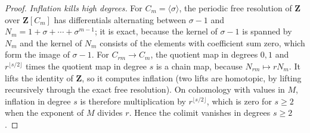 \documentclass[11pt,a4paper]{article}
\numberwithin{equation}{section}
\theoremstyle{definition}
\theoremstyle{remark}
\begin{document}
\begin{proof}
\emph{Inflation kills high degrees.} For $C_m=\langle\sigma\rangle$, the
periodic free resolution of $\mathbf Z$ over $\mathbf Z[C_m]$ has
differentials alternating between $\sigma-1$ and
$N_m=1+\sigma+\cdots+\sigma^{m-1}$; it is exact, because the kernel of
$\sigma-1$ is spanned by $N_m$ and the kernel of $N_m$ consists of the
elements with coefficient sum zero, which form the image of $\sigma-1$.
For $C_{rm}\to C_m$, the quotient map in degrees $0,1$ and $r^{\lfloor
s/2\rfloor}$ times the quotient map in degree $s$ is a chain map, because
$N_{rm}\mapsto rN_m$. It lifts the identity of $\mathbf Z$, so it
computes inflation (two lifts are homotopic, by lifting recursively
through the exact free resolution). On cohomology with values in $M$,
inflation in degree $s$ is therefore multiplication by $r^{\lfloor
s/2\rfloor}$, which is zero for $s\geq2$ when the exponent of $M$ divides
$r$. Hence the colimit vanishes in degrees $s\geq2$.
\end{proof}
\end{document}
